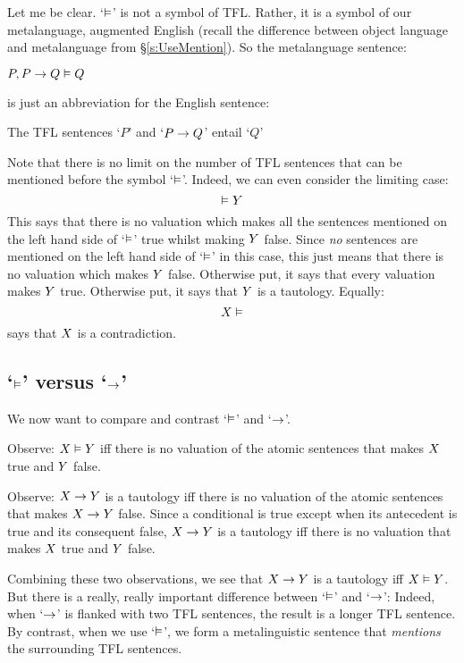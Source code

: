 Let me be clear. `$\vDash$' is not a symbol of TFL. Rather, it is a symbol of our metalanguage, augmented English (recall the difference between object language and metalanguage from \S\ref{s:UseMention}). So the metalanguage sentence:
\begin{ebullet}
	\item $P, P \rightarrow Q \vDash Q$
\end{ebullet}
is just an abbreviation for the English sentence:
\begin{ebullet}
	\item The TFL sentences `$P$' and `$P \rightarrow Q$' entail `$Q$'
\end{ebullet}
Note that there is no limit on the number of TFL sentences that can be mentioned before the symbol `$\vDash$'. Indeed, we can even consider the limiting case:
$$\vDash Y$$
This says that there is no valuation which makes all the sentences mentioned on the left hand side of `$\vDash$' true whilst making $Y$ false. Since \emph{no} sentences are mentioned on the left hand side of `$\vDash$' in this case, this just means that there is no valuation which makes $Y$ false. Otherwise put, it says that every valuation makes $Y$ true. Otherwise put, it says that $Y$ is a tautology. Equally:
$$X \vDash$$
says that $X$ is a contradiction.

\subsection{`$\vDash$' versus `$\rightarrow$'}
We now want to compare and contrast `$\vDash$' and `$\rightarrow$'.

Observe: $X \vDash Y$ iff there is no valuation of the atomic sentences that makes $X$ true and $Y$ false.

Observe: $X \rightarrow Y$ is a tautology iff there is no valuation of the atomic sentences that makes $X \rightarrow Y$ false. Since a conditional is true except when its antecedent is true and its consequent false, $X \rightarrow Y$ is a tautology iff there is no valuation that makes $X$ true and $Y$ false.

Combining these two observations, we see that $X \rightarrow Y$  is a tautology iff  $X \vDash Y$. But there is a really, really important difference between `$\vDash$' and `$\rightarrow$':
Indeed, when `$\rightarrow$' is flanked with two TFL sentences, the result is a longer TFL sentence. By contrast, when we use `$\vDash$', we form a metalinguistic sentence that \emph{mentions} the surrounding TFL sentences.

